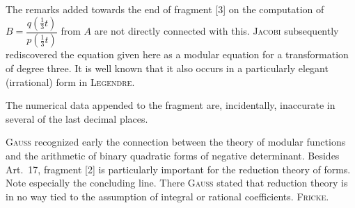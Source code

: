 The remarks added towards the end of fragment [3] on the computation of $B = \dfrac{q(\frac13 t)}{p(\frac13 t)}$ from $A$ are not directly connected with this. \textsc{Jacobi} subsequently rediscovered the equation given here as a modular equation for a transformation of degree three. It is well known that it also occurs in a particularly elegant (irrational) form in \textsc{Legendre}.

The numerical data appended to the fragment are, incidentally, inaccurate in several of the last decimal places.

\textsc{Gauss} recognized early the connection between the theory of modular functions and the arithmetic of binary quadratic forms of negative determinant. Besides Art.~17, fragment [2] is particularly important for the reduction theory of forms. Note especially the concluding line. There \textsc{Gauss} stated that reduction theory is in no way tied to the assumption of integral or rational coefficients. \hfill \textsc{Fricke}.
